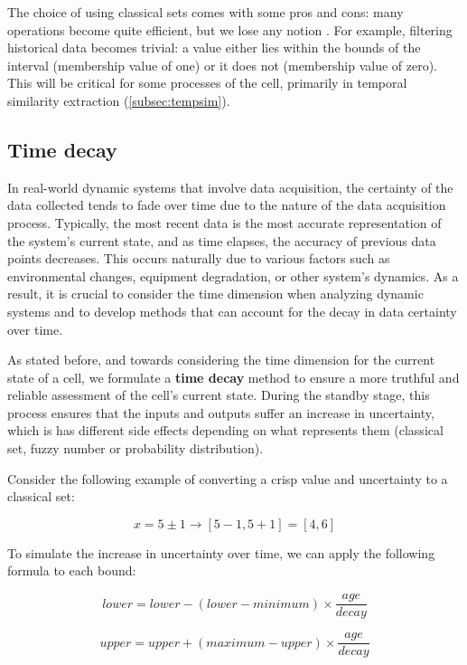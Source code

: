The choice of using classical sets comes with some pros and cons: many operations become quite efficient, but we lose any notion . For example, filtering historical data becomes trivial: a value either lies within the bounds of the interval (membership value of one) or it does not (membership value of zero). This will be critical for some processes of the cell, primarily in temporal similarity extraction (\ref{subsec:tempsim}).

\subsection{Time decay} \label{subsec:timedecay}

In real-world dynamic systems that involve data acquisition, the certainty of the data collected tends to fade over time due to the nature of the data acquisition process. Typically, the most recent data is the most accurate representation of the system's current state, and as time elapses, the accuracy of previous data points decreases. This occurs naturally due to various factors such as environmental changes, equipment degradation, or other system's dynamics. As a result, it is crucial to consider the time dimension when analyzing dynamic systems and to develop methods that can account for the decay in data certainty over time.

As stated before, and towards considering the time dimension for the current state of a cell, we formulate a \textbf{time decay} method to ensure a more truthful and reliable assessment of the cell's current state. During the standby stage, this process ensures that the inputs and outputs suffer an increase in uncertainty, which is has different side effects depending on what represents them (classical set, fuzzy number or probability distribution).

Consider the following example of converting a crisp value and uncertainty to a classical set:

$$x = 5 \pm 1 \rightarrow [5-1, 5+1] = [4, 6]$$

To simulate the increase in uncertainty over time, we can apply the following formula to each bound:

\begin{equation}
lower = lower - (lower - minimum) \times \frac{age}{decay}
\end{equation}

\begin{equation}
upper = upper + (maximum - upper) \times \frac{age}{decay}
\end{equation}

